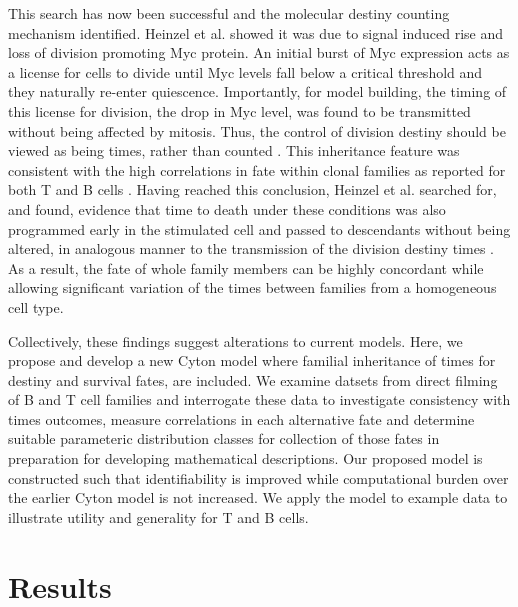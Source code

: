 \documentclass[11pt, a4paper]{article}
\begin{document}
This search has now been successful and the molecular destiny counting mechanism identified. Heinzel et al. showed it was due to signal induced rise and loss of division promoting Myc protein. An initial burst of Myc expression acts as a license for cells to divide until Myc levels fall below a critical threshold and they naturally re-enter quiescence. Importantly, for model building, the timing of this license for division, the drop in Myc level, was found to be transmitted without being affected by mitosis. Thus, the control of division destiny should be viewed as being times, rather than counted \parencite{Heinzel.2016}. This inheritance feature was consistent with the high correlations in fate within clonal families as reported for both T and B cells \parencite{Hawkins.2009, Duffy.2012, Marchingo.2016, Zhou.2018, Horton.2018}. Having reached this conclusion, Heinzel et al. searched for, and found, evidence that time to death under these conditions was also programmed early in the stimulated cell and passed to descendants without being altered, in analogous manner to the transmission of the division destiny times \parencite{Heinzel.2016}. As a result, the fate of whole family members can be highly concordant while allowing significant variation of the times between families from a homogeneous cell type.

Collectively, these findings suggest alterations to current models. Here, we propose and develop a new Cyton model where familial inheritance of times for destiny and survival fates, are included. We examine datsets from direct filming of B and T cell families and interrogate these data to investigate consistency with times outcomes, measure correlations in each alternative fate and determine suitable parameteric distribution classes for collection of those fates in preparation for developing mathematical descriptions. Our proposed model is constructed such that identifiability is improved while computational burden over the earlier Cyton model is not increased. We apply the model to example data to illustrate utility and generality for T and B cells.

\nolinenumbers
\section{Results}
\end{document}
